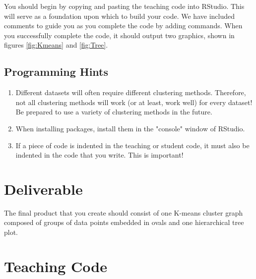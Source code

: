 You should begin by copying and pasting the teaching code into RStudio.
This will serve as a foundation upon which to build your code.
We have included comments to guide you as you complete the code by adding commands.
When you successfully complete the code, it should output two graphics, shown in figures \ref{fig:Kmeans} and \ref{fig:Tree}.

\subsection{Programming Hints}

\begin{enumerate}
 
\item Different datasets will often require different clustering methods.
Therefore, not all clustering methods will work (or at least, work well) for every dataset!
Be prepared to use a variety of clustering methods in the future.
\item When installing packages, install them in the "console" window of RStudio.
\item If a piece of code is indented in the teaching or student code, it must also be indented in the code that you write.
This is important!
 
\end{enumerate}

\section{Deliverable}

The final product that you create should consist of one K-means cluster graph composed of groups of data points embedded in ovals and one hierarchical tree plot. 

\section{Teaching Code}

